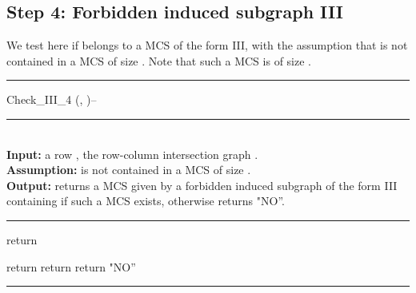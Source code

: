 \documentclass{article}
\begin{document}
\subsection{Step 4: Forbidden induced subgraph III}

We test here if  belongs to a MCS of the form III, 
with the assumption that   is not contained in a MCS of size .
Note that such a MCS is of size .

\begin{algorithm}[htpb]                    
\rule{11.7cm}{0.01cm}
\caption{Check\_III\_4 (, )--}
\rule{11.7cm}{0.01cm}
\\
{\bf Input:} a row , the row-column intersection graph .\\
{\bf Assumption:}   is not contained in a MCS of size .\\
{\bf Output:} returns a MCS  given by a forbidden induced subgraph of 
the form III containing  if such a MCS exists, otherwise returns  "NO''.
\rule{11.7cm}{0.01cm}
\begin{algorithmic}[1]
\STATE return 
\ENDIF
\ENDFOR 

\STATE return 
\ENDIF
\ENDFOR 
{}
\STATE return 
\ENDIF
\ENDFOR 
\STATE return "NO''
\end{algorithmic}
\rule{11.7cm}{0.01cm}
\end{algorithm}
\end{document}
